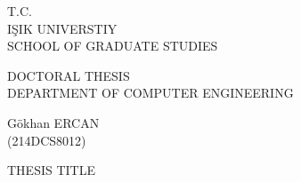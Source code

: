 \thispagestyle{empty}
\begin{center}
	\vspace*{-0.9cm}

\begin{center}
	\large{T.C.} \\
	\large{IŞIK UNIVERSTIY} \\
	\large{SCHOOL OF GRADUATE STUDIES}
\end{center}

\vspace*{0.5cm}

\large{DOCTORAL THESIS} \\
\large{DEPARTMENT OF COMPUTER ENGINEERING} \\

\vspace*{1.5cm}

\large{Gökhan ERCAN}	\\
\large{(214DCS8012)}

\vspace*{1.5cm}

\large{
	THESIS TITLE
}
\end{center} 


